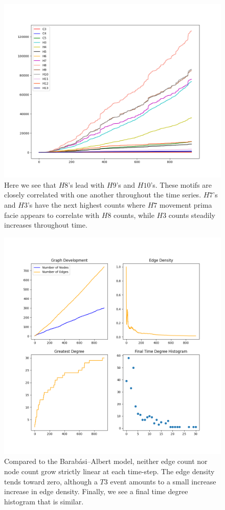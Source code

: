 \begin{figure}[h!]
    \includegraphics[width=15cm]{Images/twitter_sim_for_stats_3_0.2_0.2.png}
    \centering
    \caption{Here we see that $H8$'s lead with $H9$'s and $H10$'s. These motifs are
     closely correlated with one another throughout the time series. $H7$'s
    and $H3$'s have the next highest counts where $H7$ movement prima facie
    appears to correlate with $H8$ counts, while $H3$ counts steadily increases throughout time.}
    \label{fig:thij0202}
\end{figure}

\begin{figure}[h!]
    \includegraphics[width=14cm]{Images/twitter_sim_stats_3_0.2_0.2.png}
    \centering
    \caption{Compared to the Barabási–Albert model, neither edge count nor node
     count grow strictly linear at each time-step. The edge density tends toward
     zero, although a $T3$ event amounts to a small increase increase in edge density. Finally, we 
    see a final time degree histogram that is similar.}
\end{figure}

